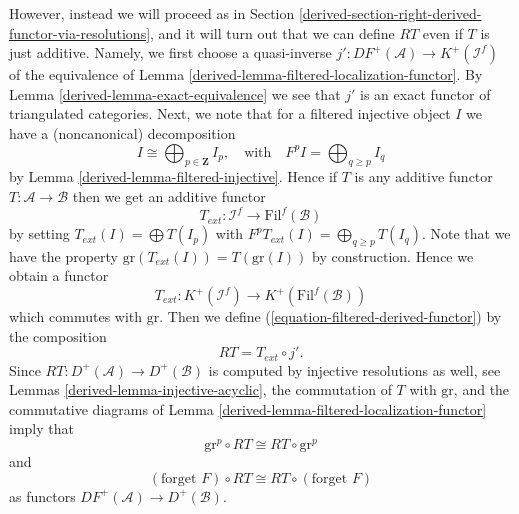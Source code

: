 \medskip\noindent
However, instead we will proceed as in
Section \ref{derived-section-right-derived-functor-via-resolutions},
and it will turn out that we can define $RT$ even if $T$ is just additive.
Namely, we first choose a quasi-inverse
$j' : DF^{+}(\mathcal{A}) \to K^{+}(\mathcal{I}^f)$ of the
equivalence of
Lemma \ref{derived-lemma-filtered-localization-functor}.
By
Lemma \ref{derived-lemma-exact-equivalence}
we see that $j'$ is an exact functor of triangulated categories.
Next, we note that for a filtered injective object $I$ we have
a (noncanonical) decomposition
\begin{equation}
\label{equation-decompose}
I \cong \bigoplus\nolimits_{p \in \mathbf{Z}} I_p,
\quad\text{with}\quad
F^pI = \bigoplus\nolimits_{q \geq p} I_q
\end{equation}
by
Lemma \ref{derived-lemma-filtered-injective}.
Hence if $T$ is any additive functor $T : \mathcal{A} \to \mathcal{B}$
then we get an additive functor
\begin{equation}
\label{equation-extend-T}
T_{ext} : \mathcal{I}^f \to \text{Fil}^f(\mathcal{B})
\end{equation}
by setting $T_{ext}(I) = \bigoplus T(I_p)$ with
$F^pT_{ext}(I) = \bigoplus_{q \geq p} T(I_q)$. Note that we have the
property $\text{gr}(T_{ext}(I)) = T(\text{gr}(I))$ by construction.
Hence we obtain a functor
\begin{equation}
\label{equation-extend-T-complexes}
T_{ext} : K^{+}(\mathcal{I}^f) \to K^{+}(\text{Fil}^f(\mathcal{B}))
\end{equation}
which commutes with $\text{gr}$. Then we define
(\ref{equation-filtered-derived-functor}) by the composition
\begin{equation}
\label{equation-definition-filtered-derived-functor}
RT = T_{ext} \circ j'.
\end{equation}
Since $RT : D^{+}(\mathcal{A}) \to D^{+}(\mathcal{B})$ is computed
by injective resolutions as well, see
Lemmas \ref{derived-lemma-injective-acyclic},
the commutation of $T$ with $\text{gr}$, and the commutative diagrams of
Lemma \ref{derived-lemma-filtered-localization-functor}
imply that
\begin{equation}
\label{equation-commute-gr}
\text{gr}^p \circ RT \cong RT \circ \text{gr}^p
\end{equation}
and
\begin{equation}
\label{equation-commute-forget}
(\text{forget }F) \circ RT \cong RT \circ (\text{forget }F)
\end{equation}
as functors $DF^{+}(\mathcal{A}) \to D^{+}(\mathcal{B})$.


